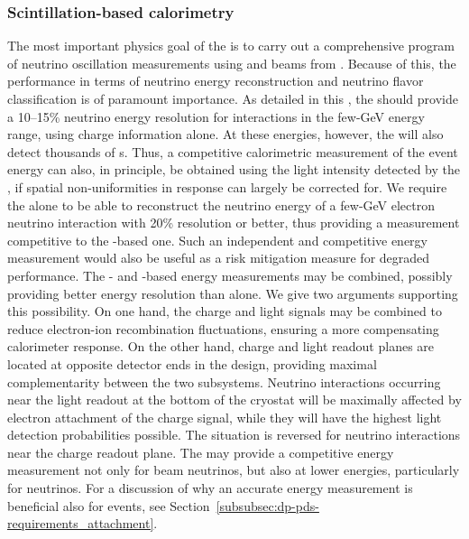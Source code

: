 \subsubsection{Scintillation-based calorimetry}

The most important physics goal of the \dune {} is to carry out a comprehensive program of neutrino oscillation measurements using \numu and \anumu beams from . Because of this, the \dune {} performance in terms of neutrino energy reconstruction and neutrino flavor classification is of paramount importance. As detailed in this , the  should provide a 10--15\% neutrino energy resolution for \nue {} interactions in the few-GeV energy range, using charge information alone. At these energies, however, the  
will also detect thousands of \phel{}s. Thus, a competitive calorimetric measurement of the event energy can also, in principle, be obtained using the light intensity detected by the , if spatial non-uniformities in  response can largely be corrected for.  We require the  alone to be able to reconstruct the neutrino energy of a few-GeV electron neutrino  interaction with 20\%  resolution or better, thus providing a measurement competitive to the -based one. Such an independent and competitive energy measurement would also be useful as a risk mitigation measure for degraded  performance. The - and -based energy measurements may be combined, possibly providing better energy resolution than  alone. We give two arguments 
supporting this possibility. On one hand, the charge and light signals may be combined to reduce electron-ion recombination fluctuations, ensuring a more compensating  calorimeter response. On the other hand, charge and light readout planes are located at opposite detector ends in the  design, providing maximal complementarity between the two subsystems. Neutrino interactions occurring near the light readout at the bottom of the cryostat will be maximally affected by electron attachment of the charge signal, while they will have the highest light detection probabilities possible. The situation is reversed for neutrino interactions near the 
charge readout plane. The  may provide a competitive energy measurement not only for beam neutrinos, but also at lower energies, particularly for  neutrinos. For a discussion of why an accurate energy measurement is beneficial also for  events, see Section~\ref{subsubsec:dp-pds-requirements_attachment}.


